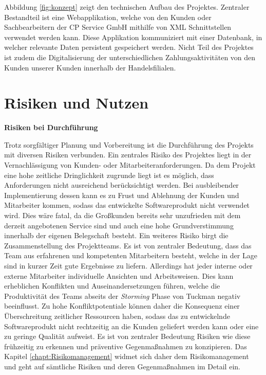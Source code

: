 Abbildung \ref{fig:konzept} zeigt den technischen Aufbau des Projektes. Zentraler Bestandteil ist eine Webapplikation, welche von den Kunden oder Sachbearbeitern der CP Service GmbH mithilfe von XML Schnittstellen verwendet werden kann. Diese Applikation kommuniziert mit einer Datenbank, in welcher relevante Daten persistent gespeichert werden.
Nicht Teil des Projektes ist zudem die Digitalisierung der unterschiedlichen Zahlungsaktivitäten von den Kunden unserer Kunden innerhalb der Handelsfilialen.

\clearpage
\section{Risiken und Nutzen}
\textbf{Risiken bei Durchführung}
\vspace{0.1cm}

Trotz sorgfältiger Planung und Vorbereitung ist die Durchführung des Projekts mit diversen Risiken verbunden. Ein zentrales Risiko des Projektes liegt in der Vernachlässigung von Kunden- oder Mitarbeiteranforderungen. Da dem Projekt eine hohe zeitliche Dringlichkeit zugrunde liegt ist es möglich, dass Anforderungen nicht ausreichend berücksichtigt werden. Bei ausbleibender Implementierung dessen kann es zu Frust und Ablehnung der Kunden und Mitarbeiter kommen, sodass das entwickelte Softwareprodukt nicht verwendet wird. Dies wäre fatal, da die Großkunden bereits sehr unzufrieden mit dem derzeit angebotenen Service sind und auch eine hohe Grundverstimmung innerhalb der eigenen Belegschaft besteht. Ein weiteres Risiko birgt die Zusammenstellung des Projektteams. Es ist von zentraler Bedeutung, dass das Team aus erfahrenen und kompetenten Mitarbeitern besteht, welche in der Lage sind in kurzer Zeit gute Ergebnisse zu liefern. Allerdings hat jeder interne oder externe Mitarbeiter individuelle Ansichten und Arbeitsweisen. Dies kann erheblichen Konflikten und Auseinandersetzungen führen, welche die Produktivität des Teams abseits der \textit{Storming} Phase von Tuckman negativ beeinflusst. Zu hohe Konfliktpotentiale können daher die Konsequenz einer Überschreitung zeitlicher Ressourcen haben, sodass das zu entwickelnde Softwareprodukt nicht rechtzeitig an die Kunden geliefert werden kann oder eine zu geringe Qualität aufweist. Es ist von zentraler Bedeutung Risiken wie diese frühzeitig zu erkennen und präventive Gegenmaßnahmen zu konzipieren. Das Kapitel \ref{chapt:Risikomanagement} widmet sich daher dem Risikomanagement und geht auf sämtliche Risiken und deren Gegenmaßnahmen im Detail ein.
\vspace{10pt}

